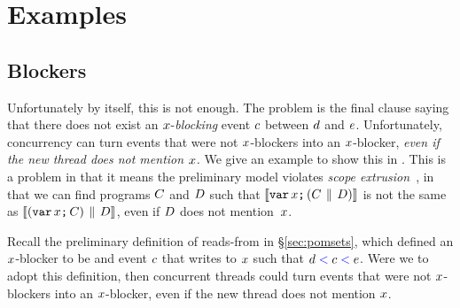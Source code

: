 \section{Examples}
\label{sec:examples}

\subsection{Blockers}
\label{app:blockers}

Unfortunately by itself, this is not enough. The problem is the final
clause saying that there does not exist an $x$-\emph{blocking}
event $c$ between $d$ and $e$. Unfortunately, concurrency can
turn events that were not $x$-blockers into an $x$-blocker,
\emph{even if the new thread does not mention $x$.}
We give an example to show this in .
This is a problem in that it means the preliminary model violates
\emph{scope extrusion}~\cite{Milner:1999:CMS:329902},
in that we can find programs $C$ and $D$ such that
$\llbracket\texttt{var}\,x\texttt{;}\,(C\,\mathbin{\|}\,D)\rrbracket$ is not the same as
$\llbracket(\texttt{var}\,x\texttt{;}\,C)\,\mathbin{\|}\,D\rrbracket$, even if $D$ does not mention~$x$.

Recall the preliminary definition of reads-from in \S\ref{sec:pomsets}, which
defined an $x$-blocker to be and event $c$ that writes to $x$ such that
$d \mathrel{{\color{blue}<}} c \mathrel{{\color{blue}<}} e$.  Were we to adopt this definition, then concurrent
threads could turn events that were not $x$-blockers into an
$x$-blocker, even if the new thread does not mention $x$.

